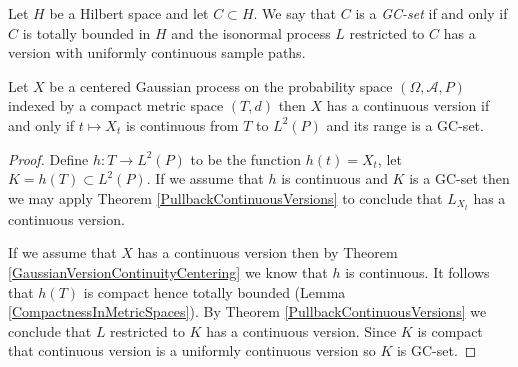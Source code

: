\begin{defn}Let $H$ be a Hilbert space and let $C \subset H$.  We say that $C$ is a \emph{GC-set} if and only if $C$ is totally bounded in $H$ and the isonormal process $L$ restricted to $C$ has a version with uniformly continuous sample paths.
\end{defn}

\begin{cor}Let $X$ be a centered Gaussian process on the probability space $(\Omega, \mathcal{A}, P)$ indexed by a compact metric space $(T,d)$ then $X$ has a continuous version if and only if $t \mapsto X_t$ is continuous from $T$ to $L^2(P)$ and its range is a GC-set.
\end{cor}
\begin{proof}
Define $h : T \to L^2(P)$ to be the function $h(t) = X_t$, let $K = h(T) \subset L^2(P)$.  If we assume that $h$ is continuous and $K$ is a GC-set then we may apply Theorem \ref{PullbackContinuousVersions} to conclude that $L_{X_t}$ has a continuous version.


If we assume that $X$ has a continuous version then by Theorem \ref{GaussianVersionContinuityCentering} we know that $h$ is continuous.  It follows that $h(T)$ is compact hence totally bounded (Lemma \ref{CompactnessInMetricSpaces}).  By Theorem \ref{PullbackContinuousVersions} we conclude that $L$ restricted to $K$ has a continuous version.  Since $K$ is compact that continuous version is a uniformly continuous version so $K$ is  GC-set.
\end{proof}
